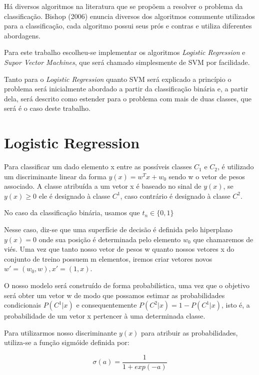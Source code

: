Há diversos algoritmos na literatura que se propõem a resolver o problema da classificação.
Bishop (2006)\cite{bishop2006} enuncia diversos dos algoritmos comumente utilizados para a
classificação, cada algoritmo possui seus prós e contras e utiliza diferentes abordagens.

Para este trabalho escolheu-se implementar os algoritmos \textit{Logistic Regression} e
\textit{Supor Vector Machines}, que será chamado simplesmente de SVM por facilidade.

Tanto para o \textit{Logistic Regression} quanto SVM será explicado a princípio o problema
será inicialmente abordado a partir da classificação binária e, a partir dela, será descrito
como estender para o problema com mais de duas classes, que será é o caso deste trabalho.

\section{Logistic Regression}
\label{sec:logreg} 

Para classificar um dado elemento x entre as possíveis classes $C_1$ e $C_2$, é utilizado
um discriminante linear da forma $y(x) = w^Tx + w_0$ sendo w o vetor de pesos associado.
A classe atribuída a um vetor x é baseado no sinal de $y(x)$, se $y(x) \ge 0$ ele é designado
à classe $C^1$, caso contrário é designado à classe $C^2$.

No caso da classificação binária, usamos que $t_n \in \{0, 1\}$

Nesse caso, diz-se que uma superfície de decisão é definida pelo hiperplano $y(x) = 0$ onde
sua posição é determinada pelo elemento $w_0$ que chamaremos de viés. Uma vez que tanto nosso
vetor de pesos w quanto nossos vetores x do conjunto de treino possuem m elementos, iremos criar
vetores novos $w' = (w_0, w), x' = (1, x)$.

O nosso modelo será construído de forma probabilística, uma vez que o objetivo será obter um vetor
w de modo que possamos estimar as probabilidades condicionais $P(C^1 | x)$ e consequentemente
$P(C^2 | x) = 1 - P(C^1 | x)$, isto é, a probabilidade de um vetor x pertencer à uma determinada 
classe. 

Para utilizarmos nosso discriminante $y(x)$ para atribuir as probabilidades, utiliza-se a função
sigmóide definida por:

\begin{center}
	\begin{equation}
		\sigma(a) = \frac{1}{1 + exp(-a)}
	\end{equation}
\end{center}

